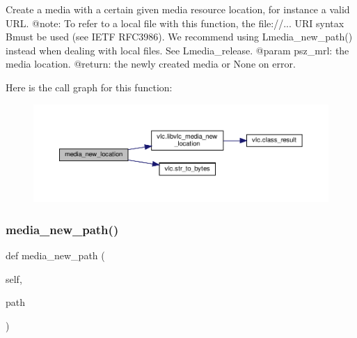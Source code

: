 \begin{DoxyVerb}Create a media with a certain given media resource location,
for instance a valid URL.
@note: To refer to a local file with this function,
the file://... URI syntax B{must} be used (see IETF RFC3986).
We recommend using L{media_new_path}() instead when dealing with
local files.
See L{media_release}.
@param psz_mrl: the media location.
@return: the newly created media or None on error.
\end{DoxyVerb}
 Here is the call graph for this function\+:
\nopagebreak
\begin{figure}[H]
\begin{center}
\leavevmode
\includegraphics[width=350pt]{classvlc_1_1_instance_a1bcce3da08d8de8c46af611da2bf37fa_cgraph}
\end{center}
\end{figure}
\mbox{\label{classvlc_1_1_instance_aaecf944e5c0044478fbb6cfc8667c974}} 
\subsubsection{\texorpdfstring{media\+\_\+new\+\_\+path()}{media\_new\_path()}}
{\footnotesize\ttfamily def media\+\_\+new\+\_\+path (\begin{DoxyParamCaption}\item[{}]{self,  }\item[{}]{path }\end{DoxyParamCaption})}


